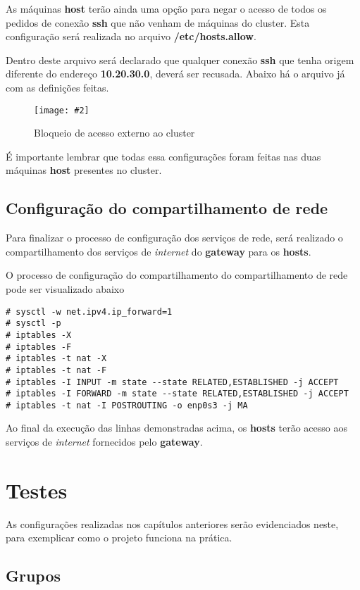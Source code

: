 \documentclass[
	12pt,				%
	openany,			%
	a4paper,			%
	chapter=TITLE,		%
	section=TITLE,		%
	english,
	brazil				%
]{abntex2}
\newcommand{\includeImage}[3] {

\begin{figure}[H]
 	 \centering
  		\texttt{[image: \#2]}
  	\caption{#3}
\end{figure}

}
\begin{document}
As máquinas \textbf{host} terão ainda uma opção para negar o acesso de todos os pedidos de conexão \textbf{ssh} que não venham de máquinas do cluster. Esta configuração será realizada no arquivo \textbf{/etc/hosts.allow}.

Dentro deste arquivo será declarado que qualquer conexão \textbf{ssh} que tenha origem diferente do endereço \textbf{10.20.30.0}, deverá ser recusada. Abaixo há o arquivo já com as definições feitas.

\includeImage{0.5}{imgs/4_configuracao_servicos_rede/1_host_2.png}{Bloqueio de acesso externo ao cluster}


É importante lembrar que todas essa configurações foram feitas nas duas máquinas \textbf{host} presentes no cluster.


\subsection{Configuração do compartilhamento de rede}

Para finalizar o processo de configuração dos serviços de rede, será realizado o compartilhamento dos serviços de \textit{internet} do \textbf{gateway} para os \textbf{hosts}.

O processo de configuração do compartilhamento do compartilhamento de rede pode ser visualizado abaixo

\begin{lstlisting}
# sysctl -w net.ipv4.ip_forward=1
# sysctl -p 
# iptables -X
# iptables -F
# iptables -t nat -X
# iptables -t nat -F 
# iptables -I INPUT -m state --state RELATED,ESTABLISHED -j ACCEPT
# iptables -I FORWARD -m state --state RELATED,ESTABLISHED -j ACCEPT 
# iptables -t nat -I POSTROUTING -o enp0s3 -j MA
\end{lstlisting} 

Ao final da execução das linhas demonstradas acima, os \textbf{hosts} terão acesso aos serviços de \textit{internet} fornecidos pelo \textbf{gateway}.
 
\section{Testes}

As configurações realizadas nos capítulos anteriores serão evidenciados neste, para exemplicar como o projeto funciona na prática.

\subsection{Grupos}
\end{document}
